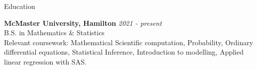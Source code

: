 \documentclass[
	11pt, %
]{resume} %
\begin{document}

\begin{rSection}{Education}
	
	\textbf{McMaster University, Hamilton} \hfill \textit{2021 - present} \\ 
	B.S. in Mathematics \& Statistics \\
	Relevant coursework: Mathematical Scientific computation, Probability, Ordinary differential equations,
	Statistical Inference, Introduction to modelling, Applied linear regression with SAS.
	
\end{rSection}


\end{document}
